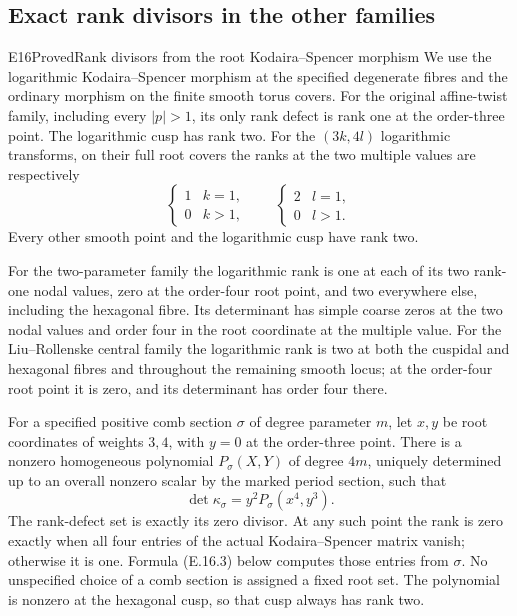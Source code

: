 \subsection{Exact rank divisors in the other families}

\begin{statement}{E16}{Proved}{Rank divisors from the root Kodaira--Spencer morphism}
We use the logarithmic Kodaira--Spencer morphism at the specified degenerate fibres and the ordinary morphism on the finite smooth torus covers. For the original affine-twist family, including every $|p|>1$, its only rank defect is rank one at the order-three point. The logarithmic cusp has rank two. For the $(3k,4l)$ logarithmic transforms, on their full root covers the ranks at the two multiple values are respectively
\[
 \begin{cases}1&k=1,\\0&k>1,\end{cases}
 \qquad
 \begin{cases}2&l=1,\\0&l>1.\end{cases}                 \tag{E.16.1}
\]
Every other smooth point and the logarithmic cusp have rank two.

For the two-parameter family the logarithmic rank is one at each of its two rank-one nodal values, zero at the order-four root point, and two everywhere else, including the hexagonal fibre. Its determinant has simple coarse zeros at the two nodal values and order four in the root coordinate at the multiple value. For the Liu--Rollenske central family the logarithmic rank is two at both the cuspidal and hexagonal fibres and throughout the remaining smooth locus; at the order-four root point it is zero, and its determinant has order four there.

For a specified positive comb section $\sigma$ of degree parameter $m$, let $x,y$ be root coordinates of weights $3,4$, with $y=0$ at the order-three point. There is a nonzero homogeneous polynomial $P_\sigma(X,Y)$ of degree $4m$, uniquely determined up to an overall nonzero scalar by the marked period section, such that
\[
 \det\kappa_\sigma=y^2P_\sigma(x^4,y^3).             \tag{E.16.2}
\]
The rank-defect set is exactly its zero divisor. At any such point the rank is zero exactly when all four entries of the actual Kodaira--Spencer matrix vanish; otherwise it is one. Formula (E.16.3) below computes those entries from $\sigma$. No unspecified choice of a comb section is assigned a fixed root set. The polynomial is nonzero at the hexagonal cusp, so that cusp always has rank two.
\end{statement}

